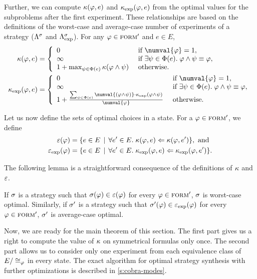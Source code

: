 Further, we can compute $\kappa(\varphi, e)$ and $\kappa_\textrm{exp}(\varphi, e)$
  from the optimal values for the subproblems after the first experiment.
These relationships are based on the definitions of the worst-case
  and average-case number of experiments of a strategy
  ($\Lambda^{\sigma}$ and $\Lambda^{\sigma}_\textrm{exp}$).
For any $\varphi\in{\textsc{form}'}$ and $e\in E$,
\begin{align}
\optval(\form, e) &= \left\{\begin{array}{ll}
 0 & \textrm{ if }\numval{\form} = 1, \\
 \infty & \textrm{ if }\exists\formx\in\outcome(e).\; \form\wedge\formx\equiv\form, \\
 1 + \max_{\formx\in\outcome(e)}\optval(\form\wedge\formx) &
 \textrm{ otherwise. }
\end{array}\right.\label{optval}\\
\optvale(\form, e) &= \left\{\begin{array}{ll}
 0 & \textrm{ if }\numval{\form} = 1, \\
 \infty & \textrm{ if }\exists\formx\in\outcome(e).\; \form\wedge\formx\equiv\form, \\
 1 + \frac{\sum_{\formx\in\outcome(e)}\numval{(\form\wedge\formx)}\cdot\optvale(\form\wedge\formx)}{\numval{\form}} &
 \textrm{ otherwise. }
\end{array}\right.\label{optvale}\\
\end{align}

Let us now define the sets of optimal choices in a state.
For a $\varphi\in{\textsc{form}'}$, we define
\begin{align*}
\varepsilon(\varphi) &= \{ e\in E \:\:|\:\: \forall e'\in E.\; \kappa(\varphi, e) <= \kappa(\varphi, e') \},\textrm{ and }\\
\varepsilon_\textrm{exp}(\varphi) &= \{ e\in E \:\:|\:\: \forall e'\in E.\; \kappa_\textrm{exp}(\varphi, e) <= \kappa_\textrm{exp}(\varphi, e') \}.
\end{align*}

The following lemma is a straightforward consequence of the definitions of $\kappa$ and~$\varepsilon$.

\begin{lemma}
If $\sigma$ is a strategy such that $\sigma(\varphi)\in\varepsilon(\varphi)$ for every $\varphi\in{\textsc{form}'}$,
 $\sigma$ is worst-case optimal.
Similarly, if $\sigma'$ is a strategy such that $\sigma'(\varphi)\in\varepsilon_\textrm{exp}(\varphi)$ for every $\varphi\in{\textsc{form}'}$,
 $\sigma'$ is average-case optimal.
\end{lemma}

Now, we are ready for the main theorem of this section.
The first part gives us a right to compute the value of $\kappa$
  on symmetrical formulas only once.
The second part
  allows us to consider
  only one experiment from
  each equivalence class of $E/\cong_{\varphi}$
  in every state.
The exact algorithm for optimal strategy synthesis
  with further optimizations is described in \autoref{s:cobra-modes}.


